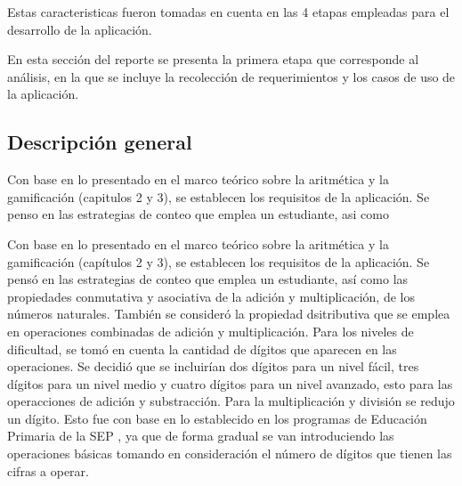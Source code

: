 \documentclass{article}
\begin{document}
Estas caracteristicas fueron tomadas en cuenta en las 4 etapas empleadas para el desarrollo de la aplicación.
 
En esta sección del reporte se presenta la primera etapa que corresponde al análisis, en la que se incluye la recolección de requerimientos y los casos de uso de la aplicación.

\subsection{Descripción general}
Con base en lo presentado en el marco teórico sobre la aritmética y la gamificación (capitulos 2 y 3),
se establecen los requisitos de la aplicación. Se penso en las estrategias de conteo que emplea un 
estudiante, asi como 

Con base en lo presentado en el marco teórico sobre la aritmética y la gamificación (capítulos 2 y 3), se establecen los requisitos de la aplicación.  Se pensó en las estrategias de conteo que emplea un estudiante, así como las propiedades conmutativa y asociativa de la adición y multiplicación, de los números naturales. También se consideró la propiedad dsitributiva que se emplea en operaciones combinadas de adición y multiplicación. Para los niveles de dificultad, se tomó en cuenta la cantidad de dígitos que aparecen en las operaciones. Se decidió que se incluirían dos dígitos para un  nivel fácil, tres dígitos para un nivel medio y cuatro dígitos para un nivel avanzado, esto para las operacciones de adición y substracción. Para la multiplicación y división se redujo un dígito. Esto fue con base en lo establecido en los programas de Educación Primaria de la SEP \cite{aprendizajes2018clave}, ya que de forma gradual se van introduciendo las operaciones básicas tomando en consideración el número de dígitos que tienen las cifras a operar.
\end{document}
